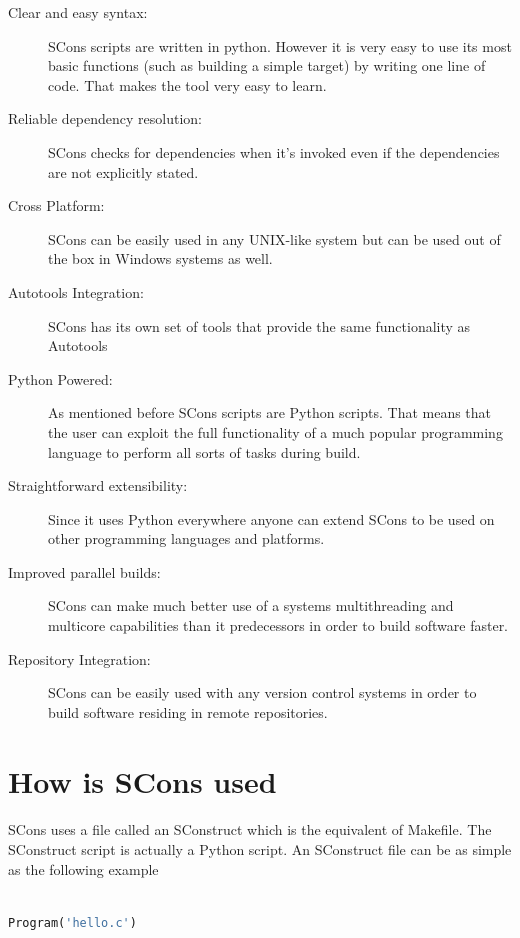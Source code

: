 \documentclass[a4paper,11pt]{report}
\begin{document}
\begin{description}
\item[Clear and easy syntax:] SCons scripts are written in python. However it is very easy to use its most basic functions (such as building a simple target) by writing one line of code. That makes the tool very easy to learn.
\item[Reliable dependency resolution:] SCons checks for dependencies when it's invoked even if the dependencies are not explicitly stated. 
\item[Cross Platform:] SCons can be easily used in any UNIX-like system but can be used out of the box in Windows systems as well. 
\item[Autotools Integration:] SCons has its own set of tools that provide the same functionality as Autotools
\item[Python Powered:] As mentioned before SCons scripts are Python scripts. That means that the user can exploit the full functionality of a much popular programming language to perform all sorts of tasks during build. 
\item[Straightforward extensibility:] Since it uses Python everywhere anyone can extend SCons to be used on other programming languages and platforms.
\item[Improved parallel builds:] SCons can make much better use of a systems multithreading and multicore capabilities than it predecessors in order to build software faster.
\item[Repository Integration:] SCons can be easily used with any version control systems in order to build software residing in remote repositories. 
\end{description}

\section{How is SCons used}

\paragraph{}

SCons uses a file called an SConstruct which is the equivalent of Makefile. The SConstruct script is actually a Python script. An SConstruct file can be as simple as the following example

\begin{lstlisting}[language=Python]

Program('hello.c')

\end{lstlisting}
\end{document}
